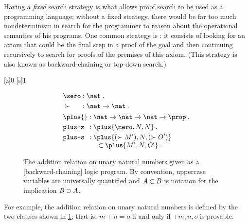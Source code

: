 Having a \emph{fixed} search strategy is what allows proof search to be used as a programming language; without a fixed strategy, there would be far too much nondeterminism in search for the programmer to reason about the operational semantics of his programs.
% 
One common strategy is : it consists of
looking for an axiom that could be the final step in a proof of the goal and then
continuing recursively to search for proofs of the premises of this axiom.
(This strategy is also known as backward-chaining or top-down search.)

\NewPredicate{\zero}[z]{0}
\RenewPredicate{\succ}[s]{1}
\begin{figure}[!tbp]
  \begin{align*}
    &\begin{alignedat}{2}
       &\zero &&: \nat \:. \\
       &\succ{} &&: \nat \to \nat \:.
     \end{alignedat}
    \\
    &\begin{alignedat}{2}
       &\plus{} &&: \nat \to \nat \to \nat \to \prop \:. \\
       &\rulename{plus-z} &&: \plus{\zero,N,N} \:. \\
       &\rulename{plus-s} &&: \!\begin{aligned}[t]
                                  \MoveEqLeft[0.5]
                                  \plus{(\succ{M'}),N,(\succ{O'})} \\[-\jot]
                                    &\pmi \plus{M',N,O'} \:.
                                \end{aligned}
     \end{alignedat}
  \end{align*}
  \caption{The addition relation on unary natural numbers given as a [backward-chaining] logic program.  By convention, uppercase variables are universally quantified and $A \mathbin{\subset} B$ is notation for the implication $B \mathbin{\supset} A$.\label{fig:plus-lp}}
\end{figure}
For example, the addition relation on unary natural numbers is defined by the two clauses shown in \cref{fig:plus-lp}; that is, $m + n = o$ if and only if $\plus{m,n,o}$ is provable.
